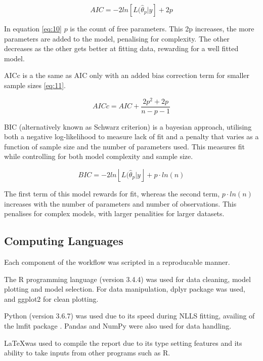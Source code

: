 \documentclass[11pt]{article}
\begin{document}
	\begin{equation}
	AIC = -2ln[L(\hat\theta_p|y] +2p \label{eq:10}
	\end{equation}
	
	In equation \ref{eq:10} \(p\) is the count of free parameters. This 2p increases, the more parameters are added to the model, penalising for complexity. The other decreases as the other gets better at fitting data, rewarding for a well fitted model. 

	AICc is a the same as AIC only with an added bias correction term for smaller sample sizes \eqref{eq:11}. 
	
	\begin{equation}
	AICc = AIC + \frac{2p^{2} + 2p}{n - p - 1} \label{eq:11}
	\end{equation}
	
	BIC (alternatively known as Schwarz criterion) is a bayesian approach, utilising both a negative log-likelihood to measure lack of fit and a penalty that varies as a function of sample size and the number of parameters used. This measures fit while controlling for both model complexity and sample size. 
	
	\begin{equation}
	BIC = -2ln\left \lfloor{L(\hat\theta_p|y}\right\rfloor + p\cdot ln(n) \label{eq:12}
	\end{equation}

	The first term of this model rewards for fit, whereas the second term, $p\cdot ln(n)$ increases with the number of parameters and number of observations. This penalises for complex models, with larger penalities for larger datasets.
	
	\subsection{Computing Languages}
	Each component of the workflow was scripted in a reproducable manner. 
	
	The R programming language (version 3.4.4) was used for data cleaning, model plotting and model selection. For data manipulation, dplyr package was used, and ggplot2 for clean plotting. 
	
	Python (version 3.6.7) was used due to its speed during NLLS fitting, availing of the lmfit package \citep{newville2016lmfit}. Pandas and NumPy were also used for data handling. 
	
	\LaTeX was used to compile the report due to its type setting features and its ability to take inputs from other programs such as R. 
	
\end{document}
